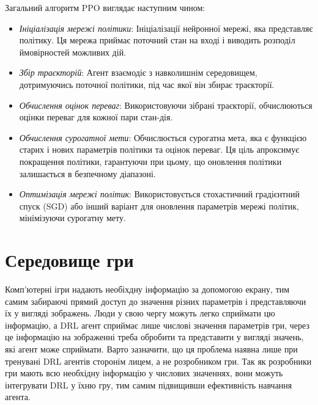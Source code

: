  Загальний алгоритм PPO виглядає наступним чином:
 \begin{itemize}
  \item {\em Ініціалізація мережі політики}: Ініціалізації нейронної мережі, яка представляє політику. Ця мережа приймає поточний стан на вході і виводить розподіл ймовірностей можливих дій.
  
  \item {\em Збір траєкторій}: Агент взаємодіє з навколишнім середовищем, дотримуючись поточної політики, під час якої він збирає траєкторії.
  
  \item {\em Обчислення оцінок переваг}: Використовуючи зібрані траєкторії, обчислюються оцінки переваг для кожної пари стан-дія.
  
  \item {\em Обчислення сурогатної мети}: Обчислюється сурогатна мета, яка є функцією старих і нових параметрів політики та оцінок переваг. Ця ціль апроксимує покращення політики, гарантуючи при цьому, що оновлення політики залишається в безпечному діапазоні.
  
  \item {\em Оптимізація мережі політик}: Використовується стохастичний градієнтний спуск (SGD) або інший варіант для оновлення параметрів мережі політик, мінімізуючи сурогатну мету.
\end{itemize}

\section{Середовище гри}
 \setcounter{equation}{0}
 \setcounter{theorem}{0}
 Комп’ютерні ігри надають необіхдну інформацію за допомогою екрану, тим самим забираючі
 прямий доступ до значення різних параметрів і представляючи їх у вигляді зображень. 
 Люди у свою чергу можуть легко сприймати цю інформацію, а DRL агент сприймає лише числові значення 
 параметрів гри, через це інформацію на зображенні треба 
 обробити та представити у вигляді значень, які агент може сприймати. Варто зазначити,
 що ця проб\-лема наявна лише при тренувані DRL агентів сторонім лицем, а не розробником гри.
 Так як розробники гри мають всю необхідну інформацію у числових значеннях, вони можуть інтегрувати DRL
 у їхню гру, тим самим підвищивши ефективність навчання агента.\\



